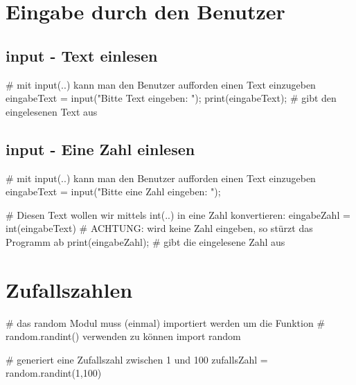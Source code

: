 \documentclass{\VorlagenPfad/coderdojokatext}
\begin{document}
\section{Eingabe durch den Benutzer}
\subsection{input - Text einlesen}
\begin{pythoncode}
# mit input(..) kann man den Benutzer aufforden einen Text einzugeben
eingabeText = input("Bitte Text eingeben: "); 
print(eingabeText); # gibt den eingelesenen Text aus
\end{pythoncode}

\subsection{input - Eine Zahl einlesen}
\begin{pythoncode}
# mit input(..) kann man den Benutzer aufforden einen Text einzugeben
eingabeText = input("Bitte eine Zahl eingeben: "); 

# Diesen Text wollen wir mittels int(..) in eine Zahl konvertieren:
eingabeZahl = int(eingabeText) 
# ACHTUNG: wird keine Zahl eingeben, so stürzt das Programm ab
print(eingabeZahl); # gibt die eingelesene Zahl aus
\end{pythoncode}


\section{Zufallszahlen}

\begin{pythoncode}
# das random Modul muss (einmal) importiert werden um die Funktion
# random.randint() verwenden zu können
import random 

# generiert eine Zufallszahl zwischen 1 und 100
zufallsZahl = random.randint(1,100)
\end{pythoncode}
\end{document}
